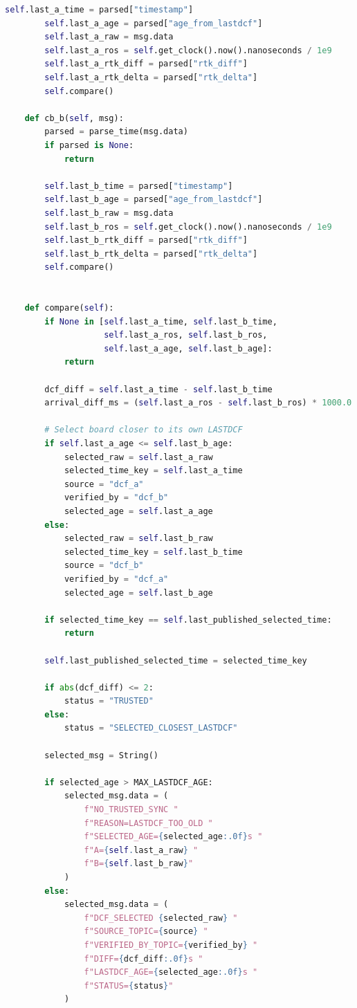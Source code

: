 \begin{lstlisting}[style=codeStyle, language=Python, caption={ROS2 comparison node for evaluating two synchronization streams.}, label={lst:rosCompareNode}]
        self.last_a_time = parsed["timestamp"]
        self.last_a_age = parsed["age_from_lastdcf"]
        self.last_a_raw = msg.data
        self.last_a_ros = self.get_clock().now().nanoseconds / 1e9
        self.last_a_rtk_diff = parsed["rtk_diff"]
        self.last_a_rtk_delta = parsed["rtk_delta"]
        self.compare()

    def cb_b(self, msg):
        parsed = parse_time(msg.data)
        if parsed is None:
            return

        self.last_b_time = parsed["timestamp"]
        self.last_b_age = parsed["age_from_lastdcf"]
        self.last_b_raw = msg.data
        self.last_b_ros = self.get_clock().now().nanoseconds / 1e9
        self.last_b_rtk_diff = parsed["rtk_diff"]
        self.last_b_rtk_delta = parsed["rtk_delta"]
        self.compare()
        

    def compare(self):
        if None in [self.last_a_time, self.last_b_time,
                    self.last_a_ros, self.last_b_ros,
                    self.last_a_age, self.last_b_age]:
            return

        dcf_diff = self.last_a_time - self.last_b_time
        arrival_diff_ms = (self.last_a_ros - self.last_b_ros) * 1000.0

        # Select board closer to its own LASTDCF
        if self.last_a_age <= self.last_b_age:
            selected_raw = self.last_a_raw
            selected_time_key = self.last_a_time
            source = "dcf_a"
            verified_by = "dcf_b"
            selected_age = self.last_a_age
        else:
            selected_raw = self.last_b_raw
            selected_time_key = self.last_b_time
            source = "dcf_b"
            verified_by = "dcf_a"
            selected_age = self.last_b_age

        if selected_time_key == self.last_published_selected_time:
            return

        self.last_published_selected_time = selected_time_key

        if abs(dcf_diff) <= 2:
            status = "TRUSTED"
        else:
            status = "SELECTED_CLOSEST_LASTDCF"

        selected_msg = String()

        if selected_age > MAX_LASTDCF_AGE:
            selected_msg.data = (
                f"NO_TRUSTED_SYNC "
                f"REASON=LASTDCF_TOO_OLD "
                f"SELECTED_AGE={selected_age:.0f}s "
                f"A={self.last_a_raw} "
                f"B={self.last_b_raw}"
            )
        else:
            selected_msg.data = (
                f"DCF_SELECTED {selected_raw} "
                f"SOURCE_TOPIC={source} "
                f"VERIFIED_BY_TOPIC={verified_by} "
                f"DIFF={dcf_diff:.0f}s "
                f"LASTDCF_AGE={selected_age:.0f}s "
                f"STATUS={status}"
            )


\end{lstlisting}

